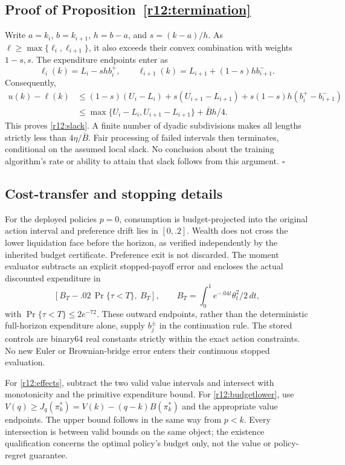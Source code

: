\subsection{Proof of Proposition~\ref{r12:termination}}
Write $a=k_i$, $b=k_{i+1}$, $h=b-a$, and $s=(k-a)/h$. As $\ell\geq\max\{\ell_i,\ell_{i+1}\}$, it also exceeds their convex combination with weights $1-s,s$. The expenditure endpoints enter as
\[
 \ell_i(k)=L_i-shb_i^+,
 \qquad \ell_{i+1}(k)=L_{i+1}+(1-s)hb_{i+1}^-.
\]
Consequently,
\begin{align*}
 u(k)-\ell(k)&\leq (1-s)(U_i-L_i)+s(U_{i+1}-L_{i+1})
       +s(1-s)h(b_i^+-b_{i+1}^-)\\
 &\leq\max\{U_i-L_i,U_{i+1}-L_{i+1}\}+\bar B h/4.
\end{align*}
This proves \eqref{r12:slack}. A finite number of dyadic subdivisions makes all lengths strictly less than $4\eta/\bar B$. Fair processing of failed intervals then terminates, conditional on the assumed local slack. No conclusion about the training algorithm's rate or ability to attain that slack follows from this argument. \hfill$\square$

\subsection{Cost-transfer and stopping details}
For the deployed policies $p=0$, consumption is budget-projected into the original action interval and preference drift lies in $[0,.2]$. Wealth does not cross the lower liquidation face before the horizon, as verified independently by the inherited budget certificate. Preference exit is not discarded. The moment evaluator subtracts an explicit stopped-payoff error and encloses the actual discounted expenditure in
\[
 \left[B_T-.02\,\Pr\{\tau<T\},\ B_T\right],
 \qquad B_T=\int_0^1e^{-.04t}\theta_t^2/2\,dt,
\]
with $\Pr\{\tau<T\}\leq2e^{-72}$. These outward endpoints, rather than the deterministic full-horizon expenditure alone, supply $b_j^\pm$ in the continuation rule. The stored controls are binary64 real constants strictly within the exact action constraints. No new Euler or Brownian-bridge error enters their continuous stopped evaluation.

For \eqref{r12:effects}, subtract the two valid value intervals and intersect with monotonicity and the primitive expenditure bound. For \eqref{r12:budgetlower}, use $V(q)\geq J_q(\pi_k^*)=V(k)-(q-k)B(\pi_k^*)$ and the appropriate value endpoints. The upper bound follows in the same way from $p<k$. Every intersection is between valid bounds on the same object; the existence qualification concerns the optimal policy's budget only, not the value or policy-regret guarantee.

